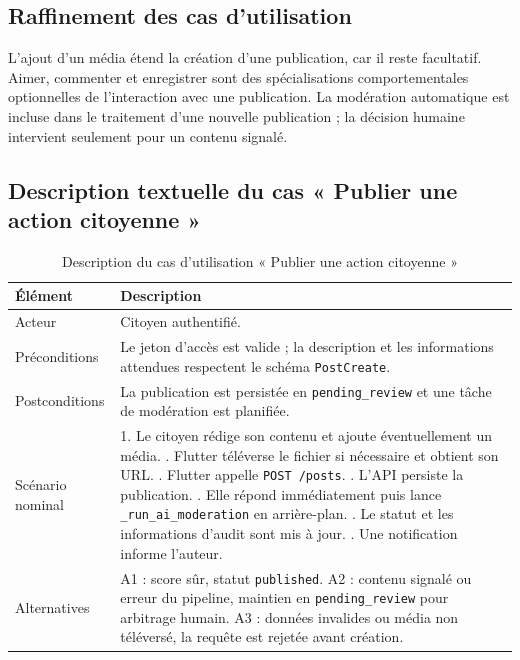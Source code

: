 \subsection{Raffinement des cas d'utilisation}

L'ajout d'un média étend la création d'une publication, car il reste facultatif. Aimer, commenter et enregistrer sont des spécialisations comportementales optionnelles de l'interaction avec une publication. La modération automatique est incluse dans le traitement d'une nouvelle publication ; la décision humaine intervient seulement pour un contenu signalé.

\label{fig:r1_s3_uc}

\subsection{Description textuelle du cas « Publier une action citoyenne »}

\begin{longtable}{|p{3.2cm}|p{10.2cm}|}
\caption{Description du cas d'utilisation « Publier une action citoyenne »}\label{tab:r1_uc_post}\\
\hline\rowcolor{gray!20}\textbf{Élément} & \textbf{Description}\\\hline
Acteur & Citoyen authentifié.\\\hline
Préconditions & Le jeton d'accès est valide ; la description et les informations attendues respectent le schéma \texttt{PostCreate}.\\\hline
Postconditions & La publication est persistée en \texttt{pending\_review} et une tâche de modération est planifiée.\\\hline
Scénario nominal & 1. Le citoyen rédige son contenu et ajoute éventuellement un média. \newline 2. Flutter téléverse le fichier si nécessaire et obtient son URL. \newline 3. Flutter appelle \texttt{POST /posts}. \newline 4. L'API persiste la publication. \newline 5. Elle répond immédiatement puis lance \texttt{\_run\_ai\_moderation} en arrière-plan. \newline 6. Le statut et les informations d'audit sont mis à jour. \newline 7. Une notification informe l'auteur.\\\hline
Alternatives & A1 : score sûr, statut \texttt{published}. \newline A2 : contenu signalé ou erreur du pipeline, maintien en \texttt{pending\_review} pour arbitrage humain. \newline A3 : données invalides ou média non téléversé, la requête est rejetée avant création.\\\hline
\end{longtable}

